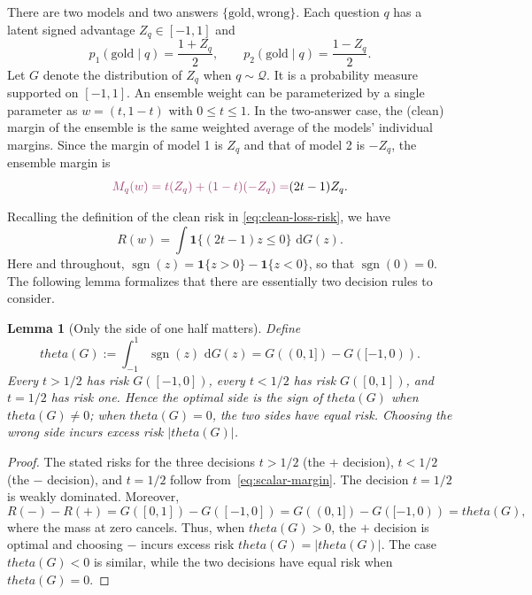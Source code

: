 \documentclass[11pt]{article}
\def\theta{theta}%
\newtheorem{lemma}[theorem]{Lemma}
\newcommand{\one}{\mathbf 1}
\newcommand{\sgn}{\operatorname{sgn}}
\newcommand{\calQ}{\mathcal Q}
\newcommand{\dd}{\,\mathrm d}
\newcommand\aed[1]{{\color{magenta!60!black} #1}}
\begin{document}
There are two models and two answers \aed{$\{\mathrm{gold}, \mathrm{wrong}\}$}.  Each question $q$ has a latent signed advantage $Z_q\in[-1,1]$ and
\begin{equation}
\label{eq:antisymmetric}
p_1(\mathrm{gold}\mid q)=\frac{1+Z_q}{2},
\qquad
p_2(\mathrm{gold}\mid q)=\frac{1-Z_q}{2}.
\end{equation}
Let $G$ denote the distribution of $Z_q$ when $q\sim\calQ$.  It is a probability measure supported on $[-1,1]$.
An ensemble weight \aed{can be parameterized by a single parameter as} $w=(t,1-t)$ with $0\le t\le1$. \aed{In the two-answer case, 
the (clean) margin of the ensemble  is the same weighted average of the models' individual margins.}
\aed{Since the margin of model 1} is $Z_q$ and that of model 2 is $-Z_q$, \aed{the ensemble margin is}
\begin{equation}
\label{eq:scalar-margin}
\aed{M_q(w) = t(Z_q) + (1-t)(-Z_q)
=} (2t-1)Z_q.
\end{equation}

Recalling the definition of the clean risk in \eqref{eq:clean-loss-risk}, we have
\[
R(w)=\int\one\{(2t-1)z\le0\}\,\dd G(z).
\]
Here and throughout, $\sgn(z)=\one\{z>0\}-\one\{z<0\}$, so that $\sgn(0)=0$.  The following lemma formalizes that there are essentially two decision rules to consider.

\begin{lemma}[Only the side of one half matters]
\label{lem:side}
\aed{Define}
\begin{equation}
\label{eq:theta}
\theta(G)
:=
\int_{-1}^1\sgn(z)\,\dd G(z)
=
G((0,1])-G([-1,0)).
\end{equation}
Every $t>1/2$ has risk \aed{$G([-1,0])$}, every $t<1/2$ has risk \aed{$G([0,1])$}, and $t=1/2$ has risk one.  Hence the optimal side is the sign of $\theta(G)$ when $\theta(G)\ne0$; when $\theta(G)=0$, the two sides have equal risk.  Choosing the wrong side incurs excess risk $|\theta(G)|$.
\end{lemma}

\begin{proof}
The stated risks for the three decisions $t>1/2$ (the $+$ decision), $t<1/2$ (the $-$ decision), and $t=1/2$ follow from~\eqref{eq:scalar-margin}.  The decision $t=1/2$ is weakly dominated.  Moreover,
\[
R(-)-R(+)
=G([0,1])-G([-1,0])
=G((0,1])-G([-1,0))
=\theta(G),
\]
where the mass at zero cancels.  Thus, when $\theta(G)>0$, the $+$ decision is optimal and choosing $-$ incurs excess risk $\theta(G)=|\theta(G)|$.  The case $\theta(G)<0$ is similar, while the two decisions have equal risk when $\theta(G)=0$.

\end{proof}
\end{document}

